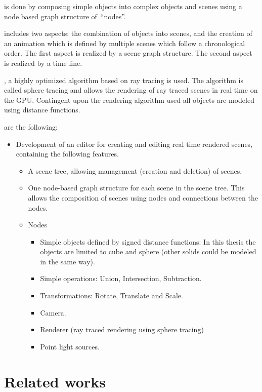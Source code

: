 \documentclass[%
    a4paper,    %
    justified,  %
    nobib,      %
    openany     %
]{tufte-book}
\begin{document}
 is done by composing simple objects into complex objects
and scenes using a node based graph structure of~\enquote{nodes}.

 includes two aspects: the combination of objects into
scenes, and the creation of an animation which is defined by multiple scenes
which follow a chronological order. The first aspect is realized by a scene
graph structure. The second aspect is realized by a time line.

, a highly optimized algorithm based on ray tracing is
used. The algorithm is called sphere tracing and allows the rendering of ray
traced scenes in real time on the GPU. Contingent upon the rendering algorithm
used all objects are modeled using distance functions.

 are the following:
\begin{itemize}
  \item Development of an editor for creating and editing real time rendered
    scenes, containing the following features.
    \begin{itemize}
      \item A scene tree, allowing management (creation and deletion) of
        scenes.
      \item One node-based graph structure for each scene in the scene tree.
        This allows the composition of scenes using
        nodes and connections between the nodes.
    \item Nodes
      \begin{itemize}
        \item Simple objects defined by signed distance functions: In this
          thesis the objects are limited to cube and sphere (other solids could
          be modeled in the same way).
        \item Simple operations: Union, Intersection, Subtraction.
        \item Transformations: Rotate, Translate and Scale.
        \item Camera.
        \item Renderer (ray traced rendering using sphere tracing)
        \item Point light sources.
      \end{itemize}
    \end{itemize}
\end{itemize}

\section{Related works}
\label{sec:related-works}
\end{document}
